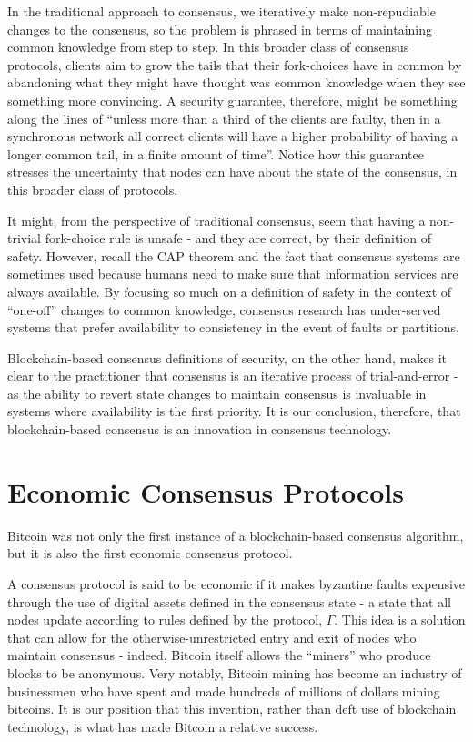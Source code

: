 \documentclass[11pt,a4paper]{article}
\theoremstyle{plain}
\theoremstyle{definition}
\begin{document}

In the traditional approach to consensus, we iteratively make non-repudiable changes to the consensus, so the problem is phrased in terms of maintaining common knowledge from step to step. In this broader class of consensus protocols, clients aim to grow the tails that their fork-choices have in common by abandoning what they might have thought was common knowledge when they see something more convincing. A security guarantee, therefore, might be something along the lines of ``unless more than a third of the clients are faulty, then in a synchronous network all correct clients will have a higher probability of having a longer common tail, in a finite amount of time''. Notice how this guarantee stresses the uncertainty that nodes can have about the state of the consensus, in this broader class of protocols.

It might, from the perspective of traditional consensus, seem that having a non-trivial fork-choice rule is unsafe - and they are correct, by their definition of safety. However, recall the CAP theorem and the fact that consensus systems are sometimes used because humans need to make sure that information services are always available. By focusing so much on a definition of safety in the context of ``one-off'' changes to common knowledge, consensus research has under-served systems that prefer availability to consistency in the event of faults or partitions. 

Blockchain-based consensus definitions of security, on the other hand, makes it clear to the practitioner that consensus is an iterative process of trial-and-error - as the ability to revert state changes to maintain consensus is invaluable in systems where availability is the first priority. It is our conclusion, therefore, that blockchain-based consensus is an innovation in consensus technology.


\section{Economic Consensus Protocols} 

Bitcoin was not only the first instance of a blockchain-based consensus algorithm, but it is also the first economic consensus protocol.

A consensus protocol is said to be economic if it makes byzantine faults expensive through the use of digital assets defined in the consensus state - a state that all nodes update according to rules defined by the protocol, $\Gamma$. This idea is a solution that can allow for the otherwise-unrestricted entry and exit of nodes who maintain consensus - indeed, Bitcoin itself allows the ``miners'' who produce blocks to be anonymous. Very notably, Bitcoin mining has become an industry of businessmen who have spent and made hundreds of millions of dollars mining bitcoins. It is our position that this invention, rather than deft use of blockchain technology, is what has made Bitcoin a relative success.
\end{document}

